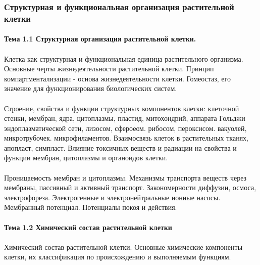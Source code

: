 \subsubsection{Структурная и функциональная организация растительной клетки}


\paragraph*{Тема 1.1 Структурная организация растительной клетки.}

\paragraph*{}Клетка как структурная и функциональная единица растительного организма. Основные черты жизнедеятельности растительной клетки. Принцип компартментализации - основа жизнедеятельности клетки. Гомеостаз, его значение для функционирования биологических систем.

\paragraph*{}Строение, свойства и функции структурных компонентов клетки: клеточной стенки, мембран, ядра, цитоплазмы, пластид, митохондрий, аппарата Гольджи эндоплазматической сети, лизосом, сфероеом. рибосом, пероксисом. вакуолей, микротрубочек. микрофиламентов. Взаимосвязь клеток в растительных тканях, апопласт, симпласт. Влияние токсичных веществ и радиации на свойства и функции мембран, цитоплазмы и органоидов клетки.

\paragraph*{}Проницаемость мембран и цитоплазмы. Механизмы транспорта веществ через мембраны, пассивный и активный транспорт. Закономерности диффузии, осмоса, электрофореза. Электрогенные и электронейтральные ионные насосы. Мембранный потенциал. Потенциалы покоя и действия.

\paragraph*{Тема 1.2 Химический состав растительной клетки}

\paragraph*{}Химический состав растительной клетки. Основные химические компоненты клетки, их классификация по происхождению и выполняемым функциям.

